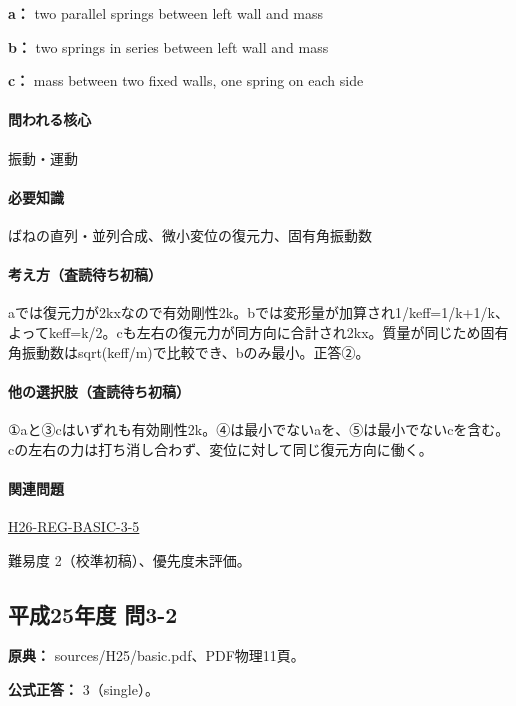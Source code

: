 \noindent\textbf{a：} two parallel springs between left wall and mass\par

\noindent\textbf{b：} two springs in series between left wall and mass\par

\noindent\textbf{c：} mass between two fixed walls, one spring on each side\par

\paragraph{問われる核心} 振動・運動

\paragraph{必要知識} ばねの直列・並列合成、微小変位の復元力、固有角振動数

\paragraph{考え方（査読待ち初稿）} aでは復元力が2kxなので有効剛性2k。bでは変形量が加算され1/keff=\allowbreak{}1/k+1/k、よってkeff=\allowbreak{}k/2。cも左右の復元力が同方向に合計され2kx。質量が同じため固有角振動数はsqrt(keff/m)で比較でき、bのみ最小。正答②。

\paragraph{他の選択肢（査読待ち初稿）} ①aと③cはいずれも有効剛性2k。④は最小でないaを、⑤は最小でないcを含む。cの左右の力は打ち消し合わず、変位に対して同じ復元方向に働く。

\paragraph{関連問題} \hyperref[q:h26-reg-basic-3-5]{H26-REG-BASIC-3-5}

\par 難易度 2（校準初稿）、優先度未評価。

\subsection{平成25年度 問3-2}
\label{q:h25-reg-basic-3-2}

\noindent\textbf{原典：} sources/H25/basic.pdf、PDF物理11頁。

\textbf{公式正答：} 3（single）。

